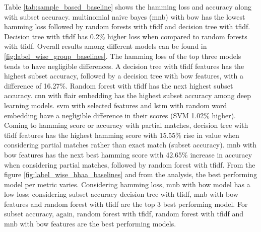 Table \ref{tab:sample_based_baseline} shows the hamming loss and accuracy along with subset accuracy. multinomial naive bayes (\acrshort{mnb}) with \acrshort{bow} has the lowest hamming loss followed by random forests with \acrshort{tfidf} and decision tree with \acrshort{tfidf}. Decision tree with \acrshort{tfidf} has 0.2\% higher loss when compared to random forests with \acrshort{tfidf}. Overall results among different models can be found in \ref{fig:label_wise_group_baselines}. The hamming loss of the top three models tends to have negligible differences. A decision tree with \acrshort{tfidf} features has the highest subset accuracy, followed by a decision tree with \acrshort{bow} features, with a difference of 16.27\%. Random forest with \acrshort{tfidf} has the next highest subset accuracy. \acrshort{cnn} with flair embedding has the highest subset accuracy among deep learning models. \acrshort{svm} with selected features and \acrshort{lstm} with random word embedding have a negligible difference in their scores (SVM 1.02\% higher).  Coming to hamming score or accuracy with partial matches, decision tree with \acrshort{tfidf} features has the highest hamming score with 15.55\% rise in value when considering partial matches rather than exact match (subset accuracy). \acrshort{mnb} with \acrshort{bow} features has the next best hamming score with 42.65\% increase in accuracy when considering partial matches, followed by  random forest with \acrshort{tfidf}. From the figure \ref{fig:label_wise_hhaa_baselines} and from the analysis, the best performing model per metric varies. Considering hamming loss, \acrlong{mnb} with \acrlong{bow} model has a low loss; considering subset accuracy decision tree with \acrshort{tfidf}, \acrshort{mnb} with \acrshort{bow} features and random forest with \acrshort{tfidf} are the top 3 best performing model. For subset accuracy, again, random forest with \acrshort{tfidf},  random forest with \acrshort{tfidf} and \acrshort{mnb} with \acrshort{bow} features are the best performing models.
